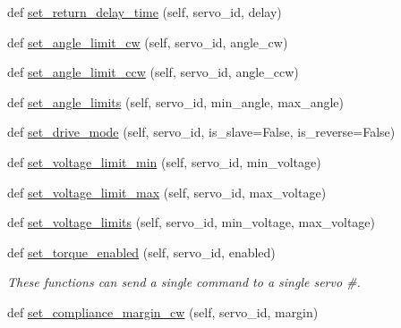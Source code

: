 \begin{DoxyCompactItemize}
\item 
def \hyperlink{classdynamixel__driver_1_1dynamixel__io_1_1_dynamixel_i_o_abb71028869bffa449bc0c6f94f44de26}{set\+\_\+return\+\_\+delay\+\_\+time} (self, servo\+\_\+id, delay)
\item 
def \hyperlink{classdynamixel__driver_1_1dynamixel__io_1_1_dynamixel_i_o_ad1845360a250bafe8e0e055245c5f1da}{set\+\_\+angle\+\_\+limit\+\_\+cw} (self, servo\+\_\+id, angle\+\_\+cw)
\item 
def \hyperlink{classdynamixel__driver_1_1dynamixel__io_1_1_dynamixel_i_o_a2cffd8bdd7929986fca71952250a6dc7}{set\+\_\+angle\+\_\+limit\+\_\+ccw} (self, servo\+\_\+id, angle\+\_\+ccw)
\item 
def \hyperlink{classdynamixel__driver_1_1dynamixel__io_1_1_dynamixel_i_o_ab40bc8abbb014fe83050af58b515e300}{set\+\_\+angle\+\_\+limits} (self, servo\+\_\+id, min\+\_\+angle, max\+\_\+angle)
\item 
def \hyperlink{classdynamixel__driver_1_1dynamixel__io_1_1_dynamixel_i_o_a86293d719e12fb9e8a1e06c0ec8a5bd8}{set\+\_\+drive\+\_\+mode} (self, servo\+\_\+id, is\+\_\+slave=False, is\+\_\+reverse=False)
\item 
def \hyperlink{classdynamixel__driver_1_1dynamixel__io_1_1_dynamixel_i_o_a59bee3249a66ca51b57d22c85d640e9b}{set\+\_\+voltage\+\_\+limit\+\_\+min} (self, servo\+\_\+id, min\+\_\+voltage)
\item 
def \hyperlink{classdynamixel__driver_1_1dynamixel__io_1_1_dynamixel_i_o_aa3057aa0c2b3efcbac7c8e5fb606b267}{set\+\_\+voltage\+\_\+limit\+\_\+max} (self, servo\+\_\+id, max\+\_\+voltage)
\item 
def \hyperlink{classdynamixel__driver_1_1dynamixel__io_1_1_dynamixel_i_o_a993cc60ca00c86d68fbc1cf342e51181}{set\+\_\+voltage\+\_\+limits} (self, servo\+\_\+id, min\+\_\+voltage, max\+\_\+voltage)
\item 
def \hyperlink{classdynamixel__driver_1_1dynamixel__io_1_1_dynamixel_i_o_aab00b3a67df7330d6ab230b4c477550c}{set\+\_\+torque\+\_\+enabled} (self, servo\+\_\+id, enabled)
\begin{DoxyCompactList}\small\item\em These functions can send a single command to a single servo \#. \end{DoxyCompactList}\item 
def \hyperlink{classdynamixel__driver_1_1dynamixel__io_1_1_dynamixel_i_o_abce41464baeefd827b2e0e751a07066a}{set\+\_\+compliance\+\_\+margin\+\_\+cw} (self, servo\+\_\+id, margin)
\item 

\end{DoxyCompactItemize}
